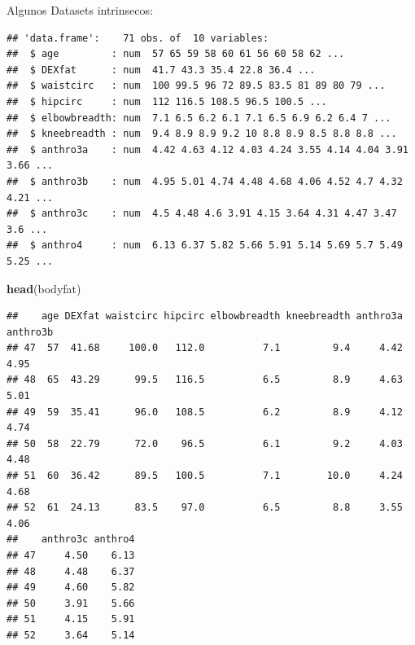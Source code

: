 \documentclass[ignorenonframetext,]{beamer}
\newenvironment{Shaded}{\begin{snugshade}}{\end{snugshade}}
\newcommand{\KeywordTok}[1]{\textcolor[rgb]{0.13,0.29,0.53}{\textbf{#1}}}
\newcommand{\NormalTok}[1]{#1}
\begin{document}
\begin{frame}[fragile]{Algunos Datasets intrinsecos:}
\begin{verbatim}
## 'data.frame':    71 obs. of  10 variables:
##  $ age         : num  57 65 59 58 60 61 56 60 58 62 ...
##  $ DEXfat      : num  41.7 43.3 35.4 22.8 36.4 ...
##  $ waistcirc   : num  100 99.5 96 72 89.5 83.5 81 89 80 79 ...
##  $ hipcirc     : num  112 116.5 108.5 96.5 100.5 ...
##  $ elbowbreadth: num  7.1 6.5 6.2 6.1 7.1 6.5 6.9 6.2 6.4 7 ...
##  $ kneebreadth : num  9.4 8.9 8.9 9.2 10 8.8 8.9 8.5 8.8 8.8 ...
##  $ anthro3a    : num  4.42 4.63 4.12 4.03 4.24 3.55 4.14 4.04 3.91 3.66 ...
##  $ anthro3b    : num  4.95 5.01 4.74 4.48 4.68 4.06 4.52 4.7 4.32 4.21 ...
##  $ anthro3c    : num  4.5 4.48 4.6 3.91 4.15 3.64 4.31 4.47 3.47 3.6 ...
##  $ anthro4     : num  6.13 6.37 5.82 5.66 5.91 5.14 5.69 5.7 5.49 5.25 ...
\end{verbatim}

\begin{Shaded}
\begin{Highlighting}[]
\KeywordTok{head}\NormalTok{(bodyfat)}
\end{Highlighting}
\end{Shaded}

\begin{verbatim}
##    age DEXfat waistcirc hipcirc elbowbreadth kneebreadth anthro3a anthro3b
## 47  57  41.68     100.0   112.0          7.1         9.4     4.42     4.95
## 48  65  43.29      99.5   116.5          6.5         8.9     4.63     5.01
## 49  59  35.41      96.0   108.5          6.2         8.9     4.12     4.74
## 50  58  22.79      72.0    96.5          6.1         9.2     4.03     4.48
## 51  60  36.42      89.5   100.5          7.1        10.0     4.24     4.68
## 52  61  24.13      83.5    97.0          6.5         8.8     3.55     4.06
##    anthro3c anthro4
## 47     4.50    6.13
## 48     4.48    6.37
## 49     4.60    5.82
## 50     3.91    5.66
## 51     4.15    5.91
## 52     3.64    5.14
\end{verbatim}

\end{frame}
\end{document}
